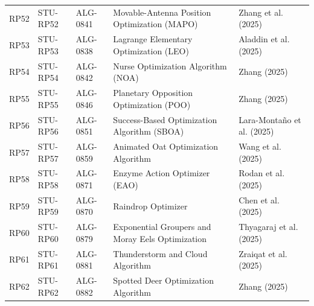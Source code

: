 \documentclass[9pt]{article}
\begin{document}
\begin{landscape}
\begin{longtable}{P{1.1cm}P{1.8cm}P{1.8cm}P{9.5cm}P{6.0cm}}
RP52 & STU-RP52 & ALG-0841 & Movable-Antenna Position Optimization (MAPO) & Zhang et al. (2025) \\
RP53 & STU-RP53 & ALG-0838 & Lagrange Elementary Optimization (LEO) & Aladdin et al. (2025) \\
RP54 & STU-RP54 & ALG-0842 & Nurse Optimization Algorithm (NOA) & Zhang (2025) \\
RP55 & STU-RP55 & ALG-0846 & Planetary Opposition Optimization (POO) & Zhang (2025) \\
RP56 & STU-RP56 & ALG-0851 & Success-Based Optimization Algorithm (SBOA) & Lara-Montaño et al. (2025) \\
RP57 & STU-RP57 & ALG-0859 & Animated Oat Optimization Algorithm & Wang et al. (2025) \\
RP58 & STU-RP58 & ALG-0871 & Enzyme Action Optimizer (EAO) & Rodan et al. (2025) \\
RP59 & STU-RP59 & ALG-0870 & Raindrop Optimizer & Chen et al. (2025) \\
RP60 & STU-RP60 & ALG-0879 & Exponential Groupers and Moray Eels Optimization & Thyagaraj et al. (2025) \\
RP61 & STU-RP61 & ALG-0881 & Thunderstorm and Cloud Algorithm & Zraiqat et al. (2025) \\
RP62 & STU-RP62 & ALG-0882 & Spotted Deer Optimization Algorithm & Zhang (2025) \\
\bottomrule\end{longtable}\end{landscape}
\end{document}
